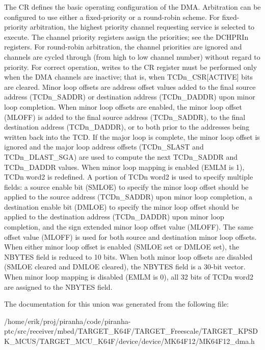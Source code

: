 The CR defines the basic operating configuration of the D\+MA. Arbitration can be configured to use either a fixed-\/priority or a round-\/robin scheme. For fixed-\/priority arbitration, the highest priority channel requesting service is selected to execute. The channel priority registers assign the priorities; see the D\+C\+H\+P\+R\+In registers. For round-\/robin arbitration, the channel priorities are ignored and channels are cycled through (from high to low channel number) without regard to priority. For correct operation, writes to the CR register must be performed only when the D\+MA channels are inactive; that is, when T\+C\+Dn\+\_\+\+C\+SR\mbox{[}A\+C\+T\+I\+VE\mbox{]} bits are cleared. Minor loop offsets are address offset values added to the final source address (T\+C\+Dn\+\_\+\+S\+A\+D\+DR) or destination address (T\+C\+Dn\+\_\+\+D\+A\+D\+DR) upon minor loop completion. When minor loop offsets are enabled, the minor loop offset (M\+L\+O\+FF) is added to the final source address (T\+C\+Dn\+\_\+\+S\+A\+D\+DR), to the final destination address (T\+C\+Dn\+\_\+\+D\+A\+D\+DR), or to both prior to the addresses being written back into the T\+CD. If the major loop is complete, the minor loop offset is ignored and the major loop address offsets (T\+C\+Dn\+\_\+\+S\+L\+A\+ST and T\+C\+Dn\+\_\+\+D\+L\+A\+S\+T\+\_\+\+S\+GA) are used to compute the next T\+C\+Dn\+\_\+\+S\+A\+D\+DR and T\+C\+Dn\+\_\+\+D\+A\+D\+DR values. When minor loop mapping is enabled (E\+M\+LM is 1), T\+C\+Dn word2 is redefined. A portion of T\+C\+Dn word2 is used to specify multiple fields\+: a source enable bit (S\+M\+L\+OE) to specify the minor loop offset should be applied to the source address (T\+C\+Dn\+\_\+\+S\+A\+D\+DR) upon minor loop completion, a destination enable bit (D\+M\+L\+OE) to specify the minor loop offset should be applied to the destination address (T\+C\+Dn\+\_\+\+D\+A\+D\+DR) upon minor loop completion, and the sign extended minor loop offset value (M\+L\+O\+FF). The same offset value (M\+L\+O\+FF) is used for both source and destination minor loop offsets. When either minor loop offset is enabled (S\+M\+L\+OE set or D\+M\+L\+OE set), the N\+B\+Y\+T\+ES field is reduced to 10 bits. When both minor loop offsets are disabled (S\+M\+L\+OE cleared and D\+M\+L\+OE cleared), the N\+B\+Y\+T\+ES field is a 30-\/bit vector. When minor loop mapping is disabled (E\+M\+LM is 0), all 32 bits of T\+C\+Dn word2 are assigned to the N\+B\+Y\+T\+ES field. 

The documentation for this union was generated from the following file\+:\begin{DoxyCompactItemize}
\item 
/home/erik/proj/piranha/code/piranha-\/ptc/src/receiver/mbed/\+T\+A\+R\+G\+E\+T\+\_\+\+K64\+F/\+T\+A\+R\+G\+E\+T\+\_\+\+Freescale/\+T\+A\+R\+G\+E\+T\+\_\+\+K\+P\+S\+D\+K\+\_\+\+M\+C\+U\+S/\+T\+A\+R\+G\+E\+T\+\_\+\+M\+C\+U\+\_\+\+K64\+F/device/device/\+M\+K64\+F12/M\+K64\+F12\+\_\+dma.\+h\end{DoxyCompactItemize}
